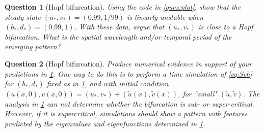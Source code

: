\documentclass[a4paper]{siamart220329}
\theoremstyle{plain}
\newtheorem{question}{Question}
\begin{document}
\begin{question}[Hopf bifurcation]\label{ques:Hopf}
  Using the code in \cref{ques:plot}, show that the steady state $(u_*,v_*)
  = (0.99,1/99)$ is linearly unstable when $(b_*,d_*) = (0.99,1)$. With these data,
  argue that $(u_*,v_*)$ is close to a Hopf bifurcation. What is the spatial
  wavelength and/or temporal period of the emerging pattern?
\end{question}

\begin{question}[Hopf bifurcation]\label{ques:HopfTimeStep}
  Produce numerical evidence in support of your predictions in \cref{ques:Hopf}. One
  way to do this is to perform a time simulation of \cref{eq:Sch} for $(b_*,d_*)$
  fixed as in \cref{ques:Hopf}, and with initial condition $(u(x,0),v(x,0)) =
  (u_*,v_*) + ( \tilde u(x), \tilde v(x))$, for ``small" $(\tilde u, \tilde v)$. The
  analysis in \cref{ques:Hopf} can not determine whether the bifurcation is sub- or
  super-critical. However, if it is supercritical, simulations should show a pattern
  with features predicted by the eigenvalues and eigenfunctions determined in
  \cref{ques:Hopf}.


\end{question}
\end{document}
